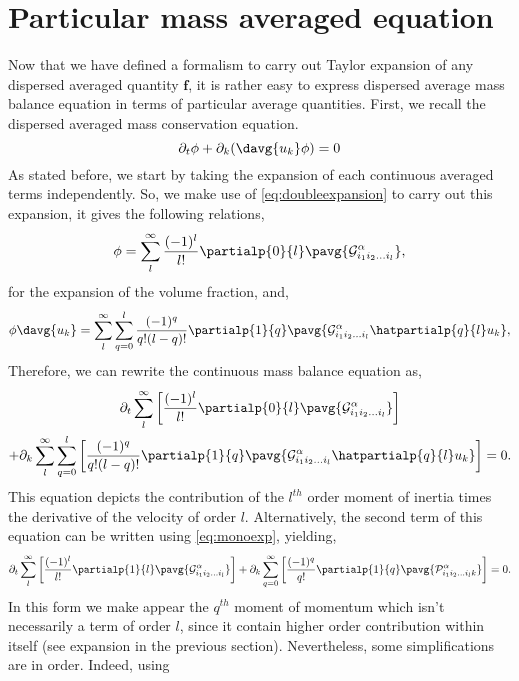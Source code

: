 \section{Particular mass averaged equation}
Now that we have defined a formalism to carry out Taylor expansion of any dispersed averaged quantity $\bm{f}$, it is rather easy to express dispersed average mass balance equation in terms of particular average quantities. 
First, we recall the dispersed averaged mass conservation equation.
\begin{equation*}
    \partial_t \phi + \partial_k (\davg{u_k} \phi)
    = 0
\end{equation*}
As stated before, we start by taking the expansion of each continuous averaged terms independently.
So, we make use of \ref{eq:doubleexpansion} to carry out this expansion, it gives the following relations,
\begin{equation*}
    \phi
    = \sum^\infty_l \frac{(-1)^l}{l!} \partialp{0}{l} \pavg{\mathcal{G}^\alpha_{i_1i_2\ldots i_l}},
\end{equation*}
for the expansion of the volume fraction, and,
\begin{equation*}
    \phi \davg{u_k}
    = \sum^\infty_l
    \sum_{q=0}^l
    \frac{(-1)^q}{q!(l-q)!}
    \partialp{1}{q} 
        \pavg{
        \mathcal{G}^\alpha_{i_1i_2\ldots i_l}
        \hatpartialp{q}{l} u_k
    },
\end{equation*}
Therefore, we can rewrite the continuous mass balance equation as,
\begin{multline*}
    \partial_t \sum_l^\infty
    \left[
        \frac{(-1)^l}{l!} \partialp{0}{l} \pavg{\mathcal{G}^\alpha_{i_1i_2\ldots i_l}}
    \right]\\
    + \partial_k
    \sum_l^\infty \sum_{q=0}^l
    \left[
        \frac{(-1)^q}{q!(l-q)!}
        \partialp{1}{q} \pavg{
            \mathcal{G}^\alpha_{i_1i_2\ldots i_l}
            \hatpartialp{q}{l} u_k
        }
    \right]
    = 0.
\end{multline*}
This equation depicts the contribution of the $l^{th}$ order moment of inertia times the derivative of the velocity of order $l$.
Alternatively, the second term of this equation can be written using \ref{eq:monoexp}, yielding,
\begin{equation}
    \partial_t
    \sum_l^\infty
    \left[
        \frac{(-1)^l}{l!} \partialp{1}{l} \pavg{\mathcal{G}^\alpha_{i_1i_2\ldots i_l}}
    \right]
    + \partial_k
    \sum_{q=0}^\infty
    \left[
        \frac{(-1)^q}{q!}
        \partialp{1}{q}
        \pavg{
            \mathcal{P}^\alpha_{i_1i_2\ldots i_l k}
        }
    \right]
    = 0.
    \label{eq:mass_order_l}
\end{equation}
In this form we make appear the $q^{th}$ moment of momentum which isn't necessarily a term of order $l$, since it contain higher order contribution within itself (see expansion in the previous section).
Nevertheless, some simplifications are in order. 
Indeed, using 









